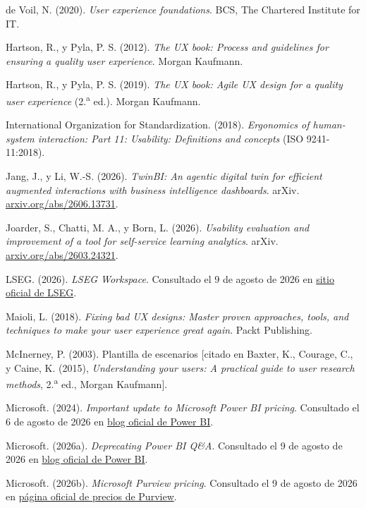 \begin{uxreferencias}
de Voil, N. (2020). \textit{User experience foundations}. BCS, The Chartered Institute for IT.

Hartson, R., y Pyla, P. S. (2012). \textit{The UX book: Process and guidelines for ensuring a
quality user experience}. Morgan Kaufmann.

Hartson, R., y Pyla, P. S. (2019). \textit{The UX book: Agile UX design for a quality user
experience} (2.\textsuperscript{a} ed.). Morgan Kaufmann.

International Organization for Standardization. (2018). \textit{Ergonomics of human-system
interaction: Part 11: Usability: Definitions and concepts} (ISO 9241-11:2018).

Jang, J., y Li, W.-S. (2026). \textit{TwinBI: An agentic digital twin for efficient augmented
interactions with business intelligence dashboards}. arXiv.
\href{https://arxiv.org/abs/2606.13731}{arxiv.org/abs/2606.13731}.

Joarder, S., Chatti, M. A., y Born, L. (2026). \textit{Usability evaluation and improvement of a
tool for self-service learning analytics}. arXiv.
\href{https://arxiv.org/abs/2603.24321}{arxiv.org/abs/2603.24321}.

LSEG. (2026). \textit{LSEG Workspace}. Consultado el 9 de agosto de 2026 en
\href{https://www.lseg.com/}{sitio oficial de LSEG}.

Maioli, L. (2018). \textit{Fixing bad UX designs: Master proven approaches, tools, and techniques
to make your user experience great again}. Packt Publishing.

McInerney, P. (2003). Plantilla de escenarios [citado en Baxter, K., Courage, C., y Caine, K.
(2015), \textit{Understanding your users: A practical guide to user research methods},
2.\textsuperscript{a} ed., Morgan Kaufmann].

Microsoft. (2024). \textit{Important update to Microsoft Power BI pricing}. Consultado el 6 de
agosto de 2026 en
\href{https://powerbi.microsoft.com/blog/important-update-to-microsoft-power-bi-pricing/}{blog
oficial de Power BI}.

Microsoft. (2026a). \textit{Deprecating Power BI Q\&A}. Consultado el 9 de agosto de 2026 en
\href{https://powerbi.microsoft.com/en-us/blog/deprecating-power-bi-qa/}{blog oficial de Power BI}.

Microsoft. (2026b). \textit{Microsoft Purview pricing}. Consultado el 9 de agosto de 2026 en
\href{https://azure.microsoft.com/en-us/pricing/details/purview/}{página oficial de precios de
Purview}.


\end{uxreferencias}
